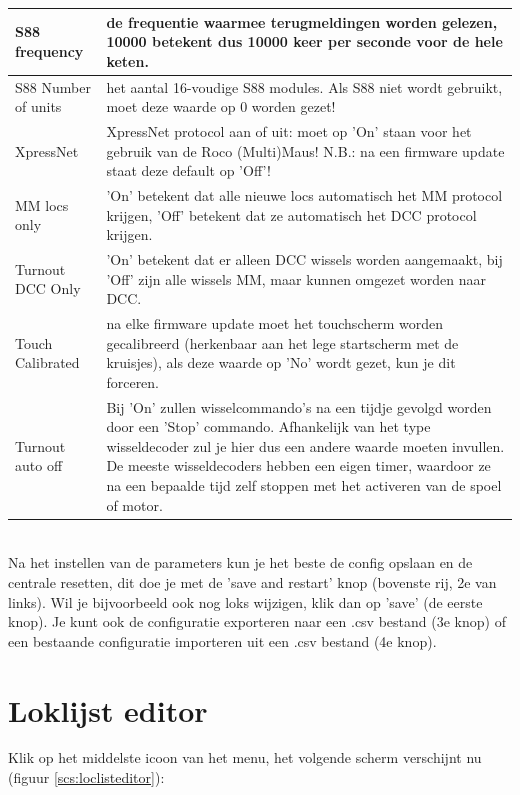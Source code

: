 \documentclass[12pt,a4paper]{report}
\begin{document}
\begin{tabular}{|l|p{10cm}|}
\hline
S88 frequency&de frequentie waarmee terugmeldingen worden gelezen, 10000 betekent dus 10000 keer per seconde voor de hele keten.\\
\hline
S88 Number of units&het aantal 16-voudige S88 modules. Als S88 niet wordt gebruikt, moet deze waarde op 0 worden gezet!\\
\hline
XpressNet&XpressNet protocol aan of uit: moet op 'On' staan voor het gebruik van de Roco (Multi)Maus! N.B.: na een firmware update staat deze default op 'Off'!\\
\hline
MM locs only&'On' betekent dat alle nieuwe locs automatisch het MM protocol krijgen, 'Off' betekent dat ze automatisch het DCC protocol krijgen.\\
\hline
Turnout DCC Only&'On' betekent dat er alleen DCC wissels worden aangemaakt, bij 'Off' zijn alle wissels MM, maar kunnen omgezet worden naar DCC.\\
\hline
Touch Calibrated&na elke firmware update moet het touchscherm worden gecalibreerd (herkenbaar aan het lege startscherm met de kruisjes), als deze waarde op 'No' wordt gezet, kun je dit forceren.\\
\hline
Turnout auto off&Bij 'On' zullen wisselcommando's na een tijdje gevolgd worden door een 'Stop' commando. Afhankelijk van het type wisseldecoder zul je hier dus een andere waarde moeten invullen. De meeste wisseldecoders hebben een eigen timer, waardoor ze na een bepaalde tijd zelf stoppen met het activeren van de spoel of motor.\\
\hline
\end{tabular}\\

Na het instellen van de parameters kun je het beste de config opslaan en de centrale resetten, dit doe je met de 'save and restart' knop (bovenste rij, 2e van links). Wil je bijvoorbeeld ook nog loks wijzigen, klik dan op 'save' (de eerste knop).
Je kunt ook de configuratie exporteren naar een .csv bestand (3e knop) of een bestaande configuratie importeren uit een .csv bestand (4e knop).

\section{Loklijst editor}
Klik op het middelste icoon van het menu, het volgende scherm verschijnt nu (figuur \ref{scs:loclisteditor}):\\
\end{document}
